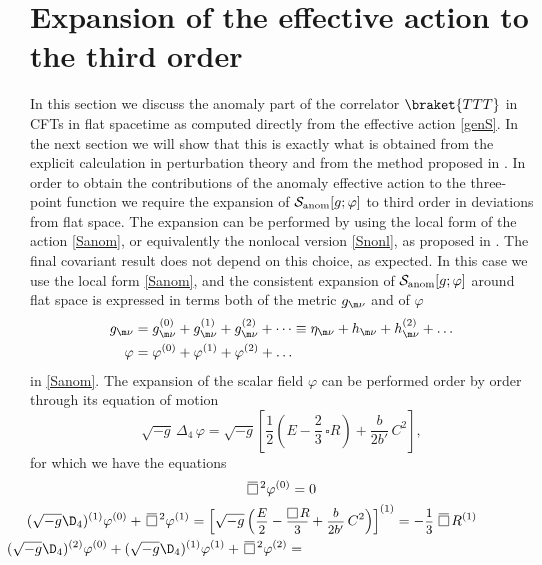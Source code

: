 \documentclass[a4paper,11pt,openright,twoside]{book}
\let\n=\nu      \let\x=\xi     \let\p=\pi      \let\r=\rho
\newcommand{\sdfrac}[2]{\mbox{\small$\displaystyle\frac{#1}{#2}$}}
\def\nbox#1#2{\vcenter{\hrule \hbox{\vrule height#2in
			\kern#1in \vrule} \hrule}}
\def\sq{\,\raise.5pt\hbox{$\nbox{.09}{.09}$}\,}
\def\sqb{\,\raise.5pt\hbox{$\overline{\nbox{.09}{.09}}$}\,}
\numberwithin{equation}{section}
\begin{document}
{{{\section{Expansion of the effective action to the third order}
\label{Sec:VarAct}
In this section we discuss the anomaly part of the correlator $\braket{TTT}$ in CFTs in flat spacetime as computed directly from the effective action \eqref{genS}. In the next section we will show that this is exactly what is obtained from the explicit calculation in perturbation theory \cite{Coriano:2018bsy} and from the method proposed in \cite{Bzowski:2013sza}.
In order to obtain the contributions of the anomaly effective action to the three-point function we require the expansion of $\mathcal{S}_{\rm anom}[g;\varphi]$ to third order in deviations from flat space. The expansion can be performed by using the local form of the action \eqref{Sanom}, or equivalently the nonlocal version \eqref{Snonl}, as proposed in \cite{Coriano:2017mux}. The final covariant result does not depend on this choice, as expected. 
In this case we use the local form \eqref{Sanom}, and the consistent expansion  of $\mathcal{S}_{\rm anom}[g;\varphi]$ around flat space is 
expressed in terms both of the metric $g_{\m\n}$ and of $\varphi$
\begin{align}
	g_{\m\n} &= g_{\m\n}^{(0)} + g_{\m\n}^{(1)} + g_{\m\n}^{(2)} + \dots \equiv \eta_{\m\n} + h_{\m\n} + h_{\m\n}^{(2)} + \dots\\
	\varphi &= \varphi^{(0)} +  \varphi^{(1)} +  \varphi^{(2)}  + \dots
\end{align}
in \eqref{Sanom}. The expansion of the scalar field $\varphi$ can be performed order by order through its equation of motion 
\begin{equation}
	\sqrt{-g}\,\Delta_4\,\varphi =\sqrt{-g}\left[\frac{1}{2}\left(E-\frac{2}{3}\,\square R\right)+\frac{b}{2b'}\,C^2\right],
\end{equation}
for which we have the equations
\begin{align}
	&\hspace{4cm}\sqb^2 \varphi^{(0)} = 0 \label{eom0}\\
	&\hspace{-1.5cm}(\sqrt{-g} \D_4)^{(1)} \varphi^{(0)} + \sqb^2 \varphi^{(1)} = \left[\sqrt{-g}
	\left( \sdfrac{E}{2}- \sdfrac{\!\sq R\!}{3} + \sdfrac{b}{2b'}\, C^2 \right)\right]^{(1)}
	= - \sdfrac{\!1\!}{3}\, \sqb R^{(1)} \label{eom1}\\
	&\hspace{-2cm}(\sqrt{-g} \D_4)^{(2)} \varphi^{(0)} + (\sqrt{-g} \D_4)^{(1)} \varphi^{(1)} + \sqb^2 \varphi^{(2)} =

\end{align}}}}
\end{document}
